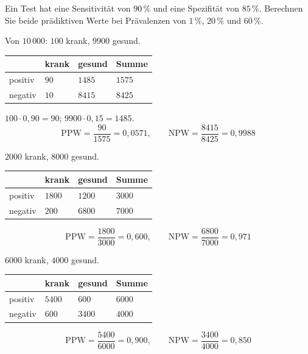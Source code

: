 \begin{aufgabe}
Ein Test hat eine Sensitivität von $90\,\%$ und eine Spezifität von $85\,\%$. Berechnen Sie beide prädiktiven Werte bei Prävalenzen von $1\,\%$, $20\,\%$ und $60\,\%$.

\loesung
{}
Von $10\,000$: $100$ krank, $9900$ gesund.
\begin{center}
\renewcommand{\arraystretch}{1.45}
\begin{tabular}{@{}P{2.0cm}P{1.8cm}P{1.8cm}P{1.8cm}@{}}
\toprule
& \textbf{krank} & \textbf{gesund} & \textbf{Summe}\\
\midrule
positiv & $90$ & $1485$ & $1575$\\
negativ & $10$ & $8415$ & $8425$\\
\bottomrule
\end{tabular}
\end{center}
 $100 \cdot 0{,}90 = 90$; $9900 \cdot 0{,}15 = 1485$.
\[ \mathrm{PPW} = \frac{90}{1575} = 0{,}0571, \qquad \mathrm{NPW} = \frac{8415}{8425} = 0{,}9988 \]

$2000$ krank, $8000$ gesund.
\begin{center}
\renewcommand{\arraystretch}{1.45}
\begin{tabular}{@{}P{2.0cm}P{1.8cm}P{1.8cm}P{1.8cm}@{}}
\toprule
& \textbf{krank} & \textbf{gesund} & \textbf{Summe}\\
\midrule
positiv & $1800$ & $1200$ & $3000$\\
negativ & $200$ & $6800$ & $7000$\\
\bottomrule
\end{tabular}
\end{center}
\[ \mathrm{PPW} = \frac{1800}{3000} = 0{,}600, \qquad \mathrm{NPW} = \frac{6800}{7000} = 0{,}971 \]

$6000$ krank, $4000$ gesund.
\begin{center}
\renewcommand{\arraystretch}{1.45}
\begin{tabular}{@{}P{2.0cm}P{1.8cm}P{1.8cm}P{1.8cm}@{}}
\toprule
& \textbf{krank} & \textbf{gesund} & \textbf{Summe}\\
\midrule
positiv & $5400$ & $600$ & $6000$\\
negativ & $600$ & $3400$ & $4000$\\
\bottomrule
\end{tabular}
\end{center}
\[ \mathrm{PPW} = \frac{5400}{6000} = 0{,}900, \qquad \mathrm{NPW} = \frac{3400}{4000} = 0{,}850 \]


\end{aufgabe}
